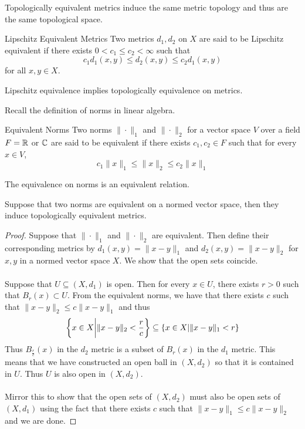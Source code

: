 \documentclass[a4paper]{article}
\begin{document}
\begin{lmm}{}{} Topologically equivalent metrics induce the same metric topology and thus are the same topological space. 
\end{lmm}

\begin{defn}{Lipschitz Equivalent Metrics}{} Two metrics $d_1,d_2$ on $X$ are said to be Lipschitz equivalent if there exists $0<c_1\leq c_2<\infty$ such that $$c_1d_1(x,y)\leq d_2(x,y)\leq c_2d_1(x,y)$$ for all $x,y\in X$. 
\end{defn}

\begin{lmm}{}{} Lipschitz equivalence implies topologically equivalence on metrics. 
\end{lmm}

Recall the definition of norms in linear algebra. 

\begin{defn}{Equivalent Norms}{} Two norms $\|\cdot\|_1$ and $\|\cdot\|_2$ for a vector space $V$ over a field $F=\mathbb{R}$ or $\mathbb{C}$ are said to be equivalent if there exists $c_1,c_2\in F$ such that for every $x\in V$, $$c_1\|x\|_1\leq\|x\|_2\leq c_2\|x\|_1$$
\end{defn}

\begin{prp}{}{} The equivalence on norms is an equivalent relation. 
\end{prp}

\begin{prp}{}{} Suppose that two norms are equivalent on a normed vector space, then they induce topologically equivalent metrics. \tcbline
\begin{proof}
Suppose that $\|\cdot\|_1$ and $\|\cdot\|_2$ are equivalent. Then define their corresponding metrics by $d_1(x,y)=\|x-y\|_1$ and $d_2(x,y)=\|x-y\|_2$ for $x,y$ in a normed vector space $X$. We show that the open sets coincide. \\~\\
Suppose that $U\subseteq(X,d_1)$ is open. Then for every $x\in U$, there exists $r>0$ such that $B_r(x)\subset U$. From the equivalent norms, we have that there exists $c$ such that $\|x-y\|_2\leq c\|x-y\|_1$ and thus $$\left\{x\in X\bigg{|}\|x-y\|_2<\frac{r}{c}\right\}\subseteq\{x\in X|\|x-y\|_1<r\}$$ Thus $B_{\frac{r}{c}}(x)$ in the $d_2$ metric is a subset of $B_r(x)$ in the $d_1$ metric. This means that we have constructed an open ball in $(X,d_2)$ so that it is contained in $U$. Thus $U$ is also open in $(X,d_2)$. \\~\\
Mirror this to show that the open sets of $(X,d_2)$ must also be open sets of $(X,d_1)$ using the fact that there exists $c$ such that $\|x-y\|_1\leq c\|x-y\|_2$ and we are done. 
\end{proof}
\end{prp}
\end{document}
